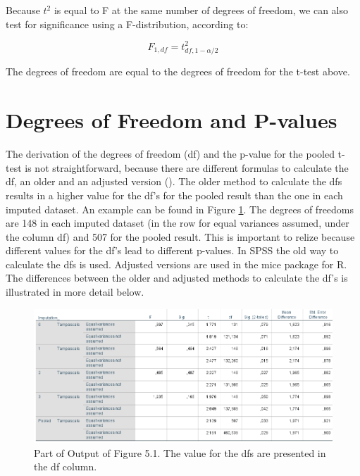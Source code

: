 \documentclass[
]{book}
\begin{document}
Because \(t^2\) is equal to F at the same number of degrees of freedom, we can also test for significance using a F-distribution, according to:

\begin{equation}
F_{1, df}=t^2_{df,1-\alpha/2}
  \label{eq:f-distr}
\end{equation}

The degrees of freedom are equal to the degrees of freedom for the t-test above.

\hypertarget{degrees-of-freedom-and-p-values}{%
\section{Degrees of Freedom and P-values}\label{degrees-of-freedom-and-p-values}}

The derivation of the degrees of freedom (df) and the p-value for the pooled t-test is not straightforward, because there are different formulas to calculate the df, an older and an adjusted version (\citet{VanBuuren2018}). The older method to calculate the dfs results in a higher value for the df's for the pooled result than the one in each imputed dataset. An example can be found in Figure \ref{fig:tab9-3}. The degrees of freedoms are 148 in each imputed dataset (in the row for equal variances assumed, under the column df) and 507 for the pooled result. This is important to relize because different values for the df's lead to different p-values.
In SPSS the old way to calculate the dfs is used. Adjusted versions are used in the mice package for R. The differences between the older and adjusted methods to calculate the df's is illustrated in more detail below.

\begin{figure}

{\centering \includegraphics[width=0.9\linewidth]{images/table5.2} 

}

\caption{Part of Output of Figure 5.1. The value for the dfs are presented in the df column.}\label{fig:tab9-3}
\end{figure}
\end{document}
